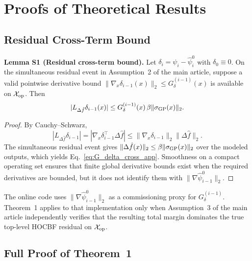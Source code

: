 \section{Proofs of Theoretical Results}
\label{sec:appendix_proofs}

\subsection{Residual Cross-Term Bound}

\noindent\textbf{Lemma S1 (Residual cross-term bound).}
\label{lem:residual_gradient}
Let $\delta_i = \psi_i - \hat{\psi}_i^0$ with $\delta_0 \equiv 0$. On the simultaneous residual event in Assumption~2 of the main article, suppose a valid pointwise derivative bound $\|\nabla_x\delta_{i-1}(x)\|_2\leq G_\delta^{(i-1)}(x)$ is available on $\mathcal{X}_{\mathrm{op}}$. Then
\begin{equation}
|L_{\Delta\hat f}\delta_{i-1}(x)|
\leq G_\delta^{(i-1)}(x)\,\beta\|\sigma_{\mathrm{GP}}(x)\|_2.
\label{eq:G_delta_cross_app}
\end{equation}

\begin{proof}
By Cauchy--Schwarz,
\begin{equation}
|L_{\Delta\hat f}\delta_{i-1}|
=|\nabla_x\delta_{i-1}^{\top}\Delta\hat f|
\leq\|\nabla_x\delta_{i-1}\|_2\|\Delta\hat f\|_2.
\label{eq:cauchy_schwarz_app}
\end{equation}
The simultaneous residual event gives $\|\Delta\hat f(x)\|_2\leq\beta\|\sigma_{\mathrm{GP}}(x)\|_2$ over the modeled outputs, which yields Eq.~\eqref{eq:G_delta_cross_app}. Smoothness on a compact operating set ensures that finite global derivative bounds exist when the required derivatives are bounded, but it does not identify them with $\|\nabla\hat\psi_{i-1}^0\|_2$.
\end{proof}

The online code uses $\|\nabla\hat\psi_{i-1}^0\|_2$ as a commissioning proxy for $G_\delta^{(i-1)}$. Theorem~1 applies to that implementation only when Assumption~3 of the main article independently verifies that the resulting total margin dominates the true top-level HOCBF residual on $\mathcal{X}_{\mathrm{op}}$.

\subsection{Full Proof of Theorem~1}

